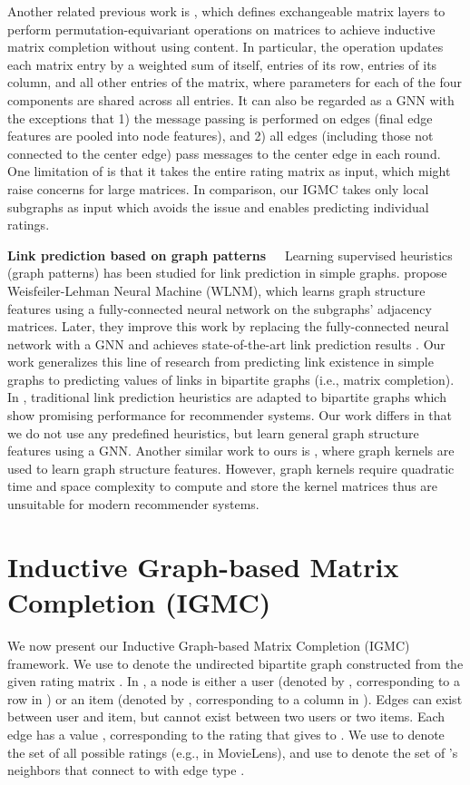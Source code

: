 \documentclass{article} \usepackage{iclr2020_conference,times}
\begin{document}
Another related previous work is \citep{hartford2018deep}, which defines exchangeable matrix layers to perform permutation-equivariant operations on matrices to achieve inductive matrix completion without using content. In particular, the operation updates each matrix entry by a weighted sum of itself, entries of its row, entries of its column, and all other entries of the matrix, where parameters for each of the four components are shared across all entries. It can also be regarded as a GNN with the exceptions that 1) the message passing is performed on edges (final edge features are pooled into node features), and 2) all edges (including those not connected to the center edge) pass messages to the center edge in each round. One limitation of \citep{hartford2018deep} is that it takes the entire rating matrix as input, which might raise concerns for large matrices. In comparison, our IGMC takes only local subgraphs as input which avoids the issue and enables predicting individual ratings. 

\noindent\textbf{Link prediction based on graph patterns~~} 
Learning supervised heuristics (graph patterns) has been studied for link prediction in simple graphs. \citet{zhang2017weisfeiler} propose Weisfeiler-Lehman Neural Machine (WLNM), which learns graph structure features using a fully-connected neural network on the subgraphs' adjacency matrices. Later, they improve this work by replacing the fully-connected neural network with a GNN and achieves state-of-the-art link prediction results \citep{zhang2018link}. Our work generalizes this line of research from predicting link existence in simple graphs to predicting values of links in bipartite graphs (i.e., matrix completion). In \citep{chen2005link,zhou2007bipartite}, traditional link prediction heuristics are adapted to bipartite graphs which show promising performance for recommender systems. Our work differs in that we do not use any predefined heuristics, but learn general graph structure features using a GNN. Another similar work to ours is \citep{li2013recommendation}, where graph kernels are used to learn graph structure features. However, graph kernels require quadratic time and space complexity to compute and store the kernel matrices thus are unsuitable for modern recommender systems.



\section{Inductive Graph-based Matrix Completion (IGMC)}
We now present our Inductive Graph-based Matrix Completion (IGMC) framework. We use  to denote the undirected bipartite graph constructed from the given rating matrix . In , a node is either a user (denoted by , corresponding to a row in ) or an item (denoted by , corresponding to a column in ). Edges can exist between user and item, but cannot exist between two users or two items. Each edge  has a value , corresponding to the rating that  gives to . We use  to denote the set of all possible ratings (e.g.,  in MovieLens), and use  to denote the set of 's neighbors that connect to  with edge type .
\end{document}

